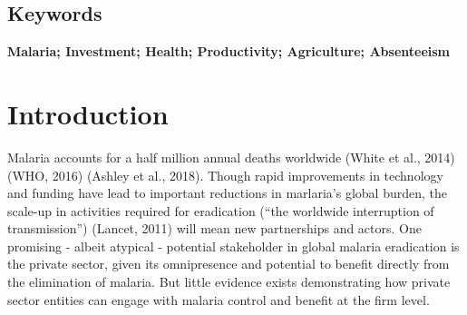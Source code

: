 \documentclass[]{article}
\begin{document}
\vspace{20mm}

\noindent{}

\vfill
\null

\subsection*{Keywords}

\textbf{Malaria; Investment; Health; Productivity; Agriculture; Absenteeism}

\vspace{3mm}

\newpage

\section{Introduction}\label{introduction}

Malaria accounts for a half million annual deaths worldwide (White et
al., 2014) (WHO, 2016) (Ashley et al., 2018). Though rapid improvements
in technology and funding have lead to important reductions in
marlaria's global burden, the scale-up in activities required for
eradication (``the worldwide interruption of transmission'') (Lancet,
2011) will mean new partnerships and actors. One promising - albeit
atypical - potential stakeholder in global malaria eradication is the
private sector, given its omnipresence and potential to benefit directly
from the elimination of malaria. But little evidence exists
demonstrating how private sector entities can engage with malaria
control and benefit at the firm level.
\end{document}
